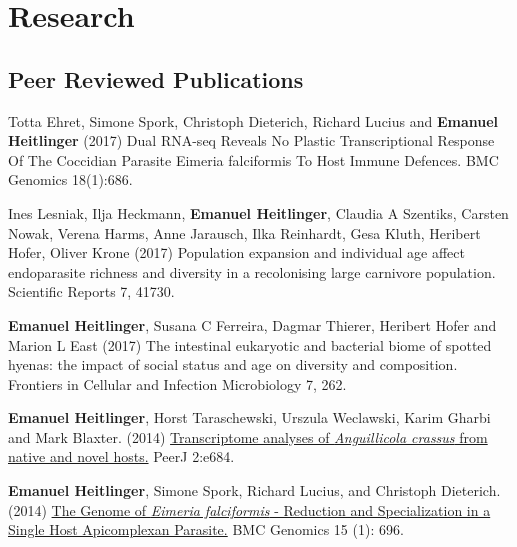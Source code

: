 \documentclass[10pt,a4paper]{article}
\renewenvironment{itemize}{
  \begin{list}{}{
    \setlength{\leftmargin}{2.5em}
    \setlength{\itemsep}{0.25em}
    \setlength{\parskip}{0pt}
    \setlength{\parsep}{0.25em}
  }
}{
  \end{list}
}
\begin{document}

\section*{Research}

\subsection*{Peer Reviewed Publications}

\begin{itemize}

\item Totta Ehret, Simone Spork, Christoph Dieterich, Richard Lucius
  and \textbf{Emanuel Heitlinger} (2017) Dual RNA-seq Reveals No
  Plastic Transcriptional Response Of The Coccidian Parasite Eimeria
  falciformis To Host Immune Defences. BMC Genomics 18(1):686.
  
\item Ines Lesniak, Ilja Heckmann, \textbf{Emanuel Heitlinger},
  Claudia A Szentiks, Carsten Nowak, Verena Harms, Anne Jarausch, Ilka
  Reinhardt, Gesa Kluth, Heribert Hofer, Oliver Krone (2017)
  Population expansion and individual age affect endoparasite richness
  and diversity in a recolonising large carnivore
  population. Scientific Reports 7, 41730.
  
\item \textbf{Emanuel Heitlinger}, Susana C Ferreira, Dagmar Thierer,
  Heribert Hofer and Marion L East (2017) The intestinal eukaryotic
  and bacterial biome of spotted hyenas: the impact of social status
  and age on diversity and composition. Frontiers in Cellular and
  Infection Microbiology 7, 262.
  
\item \textbf{Emanuel Heitlinger}, Horst Taraschewski, Urszula
  Weclawski, Karim Gharbi and Mark Blaxter. (2014)
  \href{https://peerj.com/articles/684/}{Transcriptome analyses of
    \textit{Anguillicola crassus} from native and novel hosts.}  PeerJ
  2:e684.

\item \textbf{Emanuel Heitlinger}, Simone Spork, Richard Lucius, and
  Christoph Dieterich. (2014)
  \href{http://www.biomedcentral.com/1471-2164/15/696/abstract}{The
    Genome of \textit{Eimeria falciformis} - Reduction and Specialization in a
    Single Host Apicomplexan Parasite.} BMC Genomics 15 (1): 696.


\end{itemize}
\end{document}
